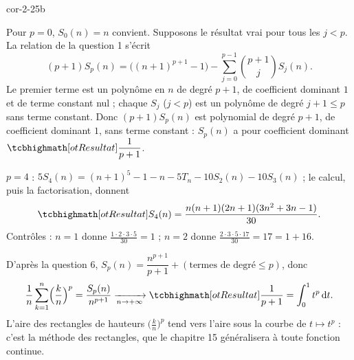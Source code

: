\begin{blocLivre}{cor-2-25b}
\begin{corrigeSuite}
\begin{questions}[start=6]
  \item Pour $p=0$, $S_0(n)=n$ convient. Supposons le résultat vrai pour
    tous les $j<p$. La relation de la question 1 s'écrit
    \[
    (p+1)S_p(n)=\bigl((n+1)^{p+1}-1\bigr)
    -\sum_{j=0}^{p-1}\binom{p+1}{j}S_j(n) .
    \]
    Le premier terme est un polynôme en $n$ de degré $p+1$, de coefficient
    dominant $1$ et de terme constant nul ; chaque $S_j$ ($j<p$) est un
    polynôme de degré $j+1\leqslant p$ sans terme constant. Donc
    $(p+1)S_p(n)$ est polynomial de degré $p+1$, de coefficient dominant
    $1$, sans terme constant : $S_p(n)$ a pour coefficient dominant
    $\res{\dfrac{1}{p+1}}$.
  \item $p=4$ :
    $5S_4(n)=(n+1)^{5}-1-n-5T_n-10S_2(n)-10S_3(n)$ ; le calcul, puis la
    factorisation, donnent
    \[
    \res{S_4(n)=\frac{n(n+1)(2n+1)(3n^{2}+3n-1)}{30}} .
    \]
    Contrôles : $n=1$ donne $\frac{1\cdot2\cdot3\cdot5}{30}=1$ ; $n=2$
    donne $\frac{2\cdot3\cdot5\cdot17}{30}=17=1+16$.
  \item D'après la question 6,
    $S_p(n)=\dfrac{n^{p+1}}{p+1}+(\text{termes de degré}\leqslant p)$,
    donc
    \[
    \frac{1}{n}\sum_{k=1}^{n}\Bigl(\frac kn\Bigr)^{p}
    =\frac{S_p(n)}{n^{p+1}}\xrightarrow[n\to+\infty]{}\res{\frac{1}{p+1}}
    =\int_{0}^{1}t^{p}\,\mathrm{d}t .
    \]
    L'aire des rectangles de hauteurs $\bigl(\frac kn\bigr)^{p}$ tend vers
    l'aire sous la courbe de $t\mapsto t^{p}$ : c'est la méthode des
    rectangles, que le chapitre 15 généralisera à toute fonction
    continue.
\end{questions}
\end{corrigeSuite}
\end{blocLivre}
